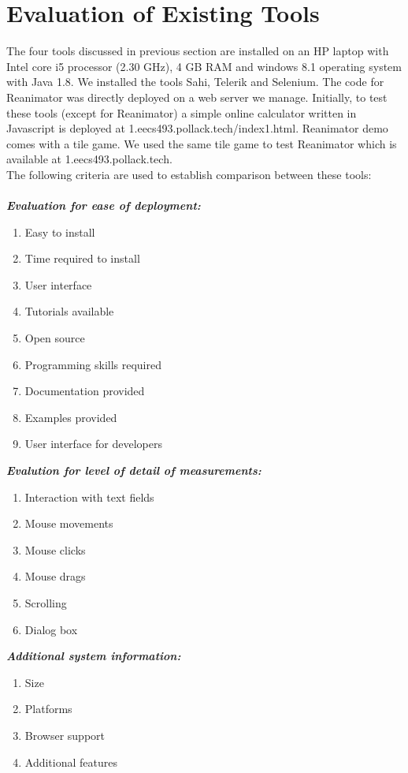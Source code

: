 \documentclass[12pt,journal]{IEEEtran}
\begin{document}
\section{Evaluation of Existing Tools}
 The four tools discussed in previous section are installed on an HP laptop with Intel core i5 processor (2.30 GHz), 4 GB RAM and windows 8.1 operating system with Java 1.8. We installed the tools Sahi, Telerik and Selenium. The code for Reanimator was directly deployed on a web server we manage. Initially, to test these tools (except for Reanimator) a simple online calculator written in Javascript is deployed at 1.eecs493.pollack.tech/index1.html. Reanimator demo comes with a tile game. We used the same tile game to test Reanimator which is available at 1.eecs493.pollack.tech.\\
The following criteria are used to establish comparison between these tools:\\ \\
\textbf{ \textit{Evaluation for ease of deployment:}}
\begin{enumerate}
\item Easy to install
\item Time required to install
\item User interface
\item Tutorials available
\item Open source
\item Programming skills required
\item Documentation provided
\item Examples provided
\item User interface for developers\\
\end{enumerate}
\textbf{\textit{Evalution for level of detail of measurements:}}
\begin{enumerate}
\item Interaction with text fields
\item Mouse movements
\item Mouse clicks
\item Mouse drags
\item Scrolling
\item Dialog box\\
\end{enumerate}
\textbf{\textit{Additional system information:}}
\begin{enumerate}
\item Size
\item Platforms
\item Browser support
\item Additional features\\
\end{enumerate}
\end{document}
